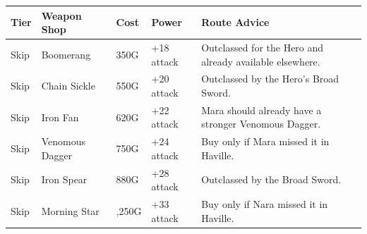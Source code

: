 \documentclass[
  american,
  10pt,
  letterpaper,
  oneside,
  open=any]{scrreprt}
\newcounter{none} %
\newenvironment{guidetable}{%
  \small\setstretch{1.0}%
  \setlength{\tabcolsep}{4pt}%
  \setlength{\LTpre}{8pt}\setlength{\LTpost}{10pt}%
  \renewcommand{\arraystretch}{1.16}%
}{ }
\begin{document}
\begin{guidetable}

{\def\LTcaptype{none} %
\begin{longtable}[]{@{}
  >{\raggedright\arraybackslash}p{}
  >{\raggedright\arraybackslash}p{}
  >{\raggedleft\arraybackslash}p{}
  >{\raggedleft\arraybackslash}p{}
  >{\raggedright\arraybackslash}p{}@{}}
\toprule\noalign{}
\begin{minipage}[b]{\linewidth}\raggedright
\color{GuideGreen}\bfseries Tier
\end{minipage} & \begin{minipage}[b]{\linewidth}\raggedright
\color{GuideGreen}\bfseries Weapon Shop
\end{minipage} & \begin{minipage}[b]{\linewidth}\raggedleft
\color{GuideGreen}\bfseries Cost
\end{minipage} & \begin{minipage}[b]{\linewidth}\raggedleft
\color{GuideGreen}\bfseries Power
\end{minipage} & \begin{minipage}[b]{\linewidth}\raggedright
\color{GuideGreen}\bfseries Route Advice
\end{minipage} \\
\midrule\noalign{}
\endhead
\bottomrule\noalign{}
\endlastfoot
Skip & Boomerang & 350G & +18 attack & Outclassed for the Hero and
already available elsewhere. \\
Skip & Chain Sickle & 550G & +20 attack & Outclassed by the Hero's Broad
Sword. \\
Skip & Iron Fan & 620G & +22 attack & Mara should already have a
stronger Venomous Dagger. \\
Skip & Venomous Dagger & 750G & +24 attack & Buy only if Mara missed it
in Haville. \\
Skip & Iron Spear & 880G & +28 attack & Outclassed by the Broad
Sword. \\
Skip & Morning Star & 1,250G & +33 attack & Buy only if Nara missed it
in Haville. \\
\end{longtable}
}

\end{guidetable}
\end{document}
